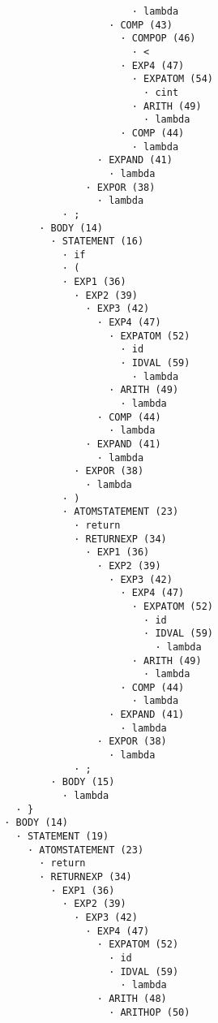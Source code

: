 \begin{enumerate}
\begin{tcolorbox}[title={Árbol sintáctico}, colback=white, breakable]
\begin{lstlisting}
                              · lambda
                          · COMP (43)
                            · COMPOP (46)
                              · <
                            · EXP4 (47)
                              · EXPATOM (54)
                                · cint
                              · ARITH (49)
                                · lambda
                            · COMP (44)
                              · lambda
                        · EXPAND (41)
                          · lambda
                      · EXPOR (38)
                        · lambda
                  · ;
              · BODY (14)
                · STATEMENT (16)
                  · if
                  · (
                  · EXP1 (36)
                    · EXP2 (39)
                      · EXP3 (42)
                        · EXP4 (47)
                          · EXPATOM (52)
                            · id
                            · IDVAL (59)
                              · lambda
                          · ARITH (49)
                            · lambda
                        · COMP (44)
                          · lambda
                      · EXPAND (41)
                        · lambda
                    · EXPOR (38)
                      · lambda
                  · )
                  · ATOMSTATEMENT (23)
                    · return
                    · RETURNEXP (34)
                      · EXP1 (36)
                        · EXP2 (39)
                          · EXP3 (42)
                            · EXP4 (47)
                              · EXPATOM (52)
                                · id
                                · IDVAL (59)
                                  · lambda
                              · ARITH (49)
                                · lambda
                            · COMP (44)
                              · lambda
                          · EXPAND (41)
                            · lambda
                        · EXPOR (38)
                          · lambda
                    · ;
                · BODY (15)
                  · lambda
          · }
        · BODY (14)
          · STATEMENT (19)
            · ATOMSTATEMENT (23)
              · return
              · RETURNEXP (34)
                · EXP1 (36)
                  · EXP2 (39)
                    · EXP3 (42)
                      · EXP4 (47)
                        · EXPATOM (52)
                          · id
                          · IDVAL (59)
                            · lambda
                        · ARITH (48)
                          · ARITHOP (50)

\end{lstlisting}
\end{tcolorbox}
\end{enumerate}

